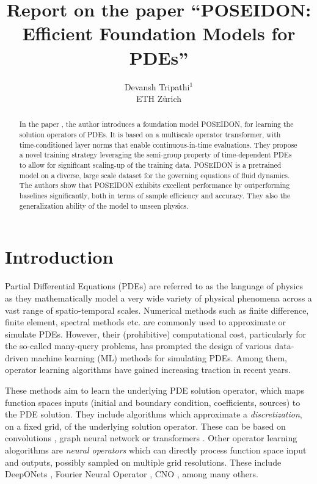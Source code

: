 \documentclass[reqno,10pt]{amsart}
\title{Report on the paper ``{\Large P}OSEIDON: Efficient Foundation Models for PDEs''}
\author{Devansh Tripathi$^1$ \\ ETH Z\lowercase{\"urich}}
\theoremstyle{plain}
\theoremstyle{definition}
\begin{document}

\begin{abstract}
    In the paper \cite{MH2024}, the author introduces a foundation model {\large P}OSEIDON, for learning the solution operators of PDEs. It is based on a multiscale operator transformer, with time-conditioned layer norms that enable continuous-in-time evaluations. They propose a novel training strategy leveraging the semi-group property of time-dependent PDEs to allow for significant scaling-up of the training data. {\large P}OSEIDON is a pretrained model on a diverse, large scale dataset for the governing equations of fluid dynamics. The authors show that {\large P}OSEIDON exhibits excellent performance by outperforming baselines significantly, both in terms of sample efficiency and accuracy. They also the generalization ability of the model to unseen physics.
\end{abstract}
\maketitle
\section{\bf Introduction}
\noindent Partial Differential Equations (PDEs) are referred to as the language of physics as they mathematically model a very wide variety of physical phenomena across a vast range of spatio-temporal scales. Numerical methods such as finite difference, finite element, spectral methods etc. are commonly used to approximate or simulate PDEs. However, their (prohibitive) computational cost, particularly for the so-called many-query problems, has prompted the design of various data-driven machine learning (ML) methods for simulating PDEs. Among them, operator learning algorithms have gained increasing traction in recent years.

\noindent These methods aim to learn the underlying PDE solution operator, which maps function spaces inputs (initial and boundary condition, coefficients, sources) to the PDE solution. They include algorithms which approximate a {\it discretization}, on a fixed grid, of the underlying solution operator. These can be based on convolutions \cite{YZ2018}, graph neural network \cite{TP2021,ASG2020} or transformers \cite{MP2022,ZH2023}. Other operator learning alogorithms are {\it neural operators} which can directly process function space input and outputs, possibly sampled on multiple grid resolutions. These include DeepONets \cite{LL2021}, Fourier Neural Operator \cite{ZL2021}, CNO \cite{BR2023}, among many others.
\end{document}
